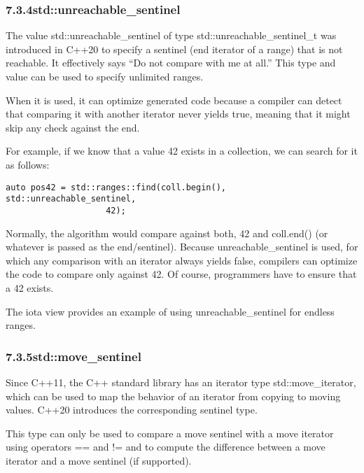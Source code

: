 \subsubsection*{ 7.3.4\hspace{0.2cm}std::unreachable\_sentinel}

The value std::unreachable\_sentinel of type std::unreachable\_sentinel\_t was introduced in C++20 to specify a sentinel (end iterator of a range) that is not reachable. It effectively says “Do not compare with me at all.” This type and value can be used to specify unlimited ranges.

When it is used, it can optimize generated code because a compiler can detect that comparing it with another iterator never yields true, meaning that it might skip any check against the end.

For example, if we know that a value 42 exists in a collection, we can search for it as follows:

\begin{lstlisting}[style=styleCXX]
auto pos42 = std::ranges::find(coll.begin(), std::unreachable_sentinel,
					42);
\end{lstlisting}

Normally, the algorithm would compare against both, 42 and coll.end() (or whatever is passed as the end/sentinel). Because unreachable\_sentinel is used, for which any comparison with an iterator always yields false, compilers can optimize the code to compare only against 42. Of course, programmers have to ensure that a 42 exists.

The iota view provides an example of using unreachable\_sentinel for endless ranges.

\subsubsection*{ 7.3.5\hspace{0.2cm}std::move\_sentinel}

Since C++11, the C++ standard library has an iterator type std::move\_iterator, which can be used to map the behavior of an iterator from copying to moving values. C++20 introduces the corresponding sentinel type.

This type can only be used to compare a move sentinel with a move iterator using operators == and != and to compute the difference between a move iterator and a move sentinel (if supported).

